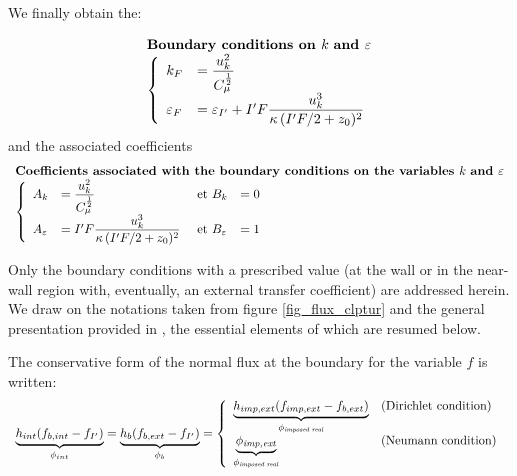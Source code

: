 We finally obtain the:

\begin{equation}
\begin{array}{l}
\text{\bf Boundary conditions on } k \text { \bf and } \varepsilon \\
\left\{\begin{array}{ll}
k_F&= \displaystyle\frac{u_k^2}{C_\mu^\frac{1}{2}}\\
\varepsilon_F&=\varepsilon_{I'}+I'F\displaystyle\frac{ u_k^3}{\kappa\,
 (I'F/2 + z_0)^2}
\end{array}\right. \\
\end{array}
\end{equation}
and the associated coefficients
\begin{equation}
\begin{array}{l}
\text{\bf Coefficients associated with the boundary conditions on the variables }
k \text { \bf and } \varepsilon \\
\left\{\begin{array}{llll}
A_k&= \displaystyle\frac{u_k^2}{C_\mu^\frac{1}{2}} &\text{ et } B_k&= 0 \\
A_\varepsilon&=I'F\displaystyle\frac{ u_k^3}{\kappa\, (I'F/2 + z_0)^2}&\text{ et } B_\varepsilon&= 1
\end{array}\right.\\
\end{array}
\end{equation}

\newpage
{}
Only the boundary conditions with a prescribed value (at the wall or in the near-wall
region with, eventually, an external transfer coefficient) are addressed herein. We
draw on the notations taken from figure \ref{fig_flux_clptur} and the general presentation
provided in , the essential elements of which are resumed below.

The conservative form of the normal flux at the boundary for the variable $f$ is written:
\begin{equation}\label{eq_flux_clptur}
\begin{array}{l}
    \underbrace{h_{int}(f_{b,int}-f_{I'})}_{\phi_{int}}
  = \underbrace{h_{b}(f_{b,ext}-f_{I'})}_{\phi_{b}}
  = \left\{\begin{array}{ll}
    \underbrace{h_{imp,ext}(f_{imp,ext}-f_{b,ext})}_{\phi_{\text{\it imposed real}}} &\text{(Dirichlet condition)}\\
    \underbrace{\phi_{\text{\it imp,ext}}}_{\phi_{\text{\it imposed real}}}
            &\text{(Neumann condition)}
           \end{array}\right.
\end{array}
\end{equation}


